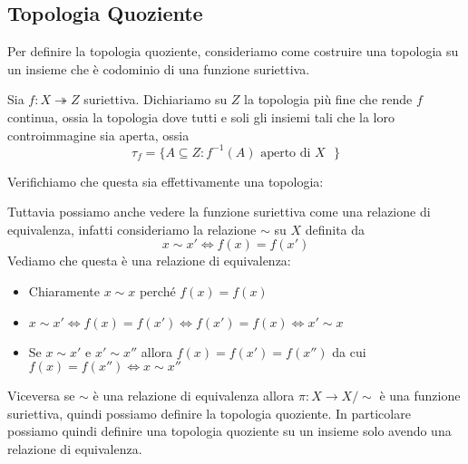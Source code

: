 \subsection{Topologia Quoziente}
Per definire la topologia quoziente, consideriamo come costruire una
topologia su un insieme che è codominio di una funzione suriettiva.
\begin{definition}

Sia
\(f: X \twoheadrightarrow Z\) suriettiva. Dichiariamo su \(Z\) la topologia più
fine che rende \(f\) continua, ossia la topologia dove tutti e soli gli insiemi
tali che la loro controimmagine sia aperta, ossia
\[
    \tau_f = \{A \subseteq Z : f^{-1}(A) \text{ aperto di \(X\)  }\}
\]
\end{definition}
Verifichiamo che questa sia effettivamente una topologia:
Tuttavia possiamo anche vedere la funzione suriettiva come una relazione di
equivalenza, infatti consideriamo la relazione \(\sim\) su \(X\) definita da
\[
    x \sim x' \iff f(x) = f(x')
\]
Vediamo che questa è una relazione di equivalenza:
\begin{itemize}[label = --]
    \item Chiaramente \(x \sim x\) perché \(f(x) = f(x)\) 
    \item \(x \sim x' \iff f(x) = f(x') \iff f(x') = f(x) \iff x' \sim x\) 
    \item Se \(x \sim x'\) e \(x' \sim x''\) allora \(f(x) = f(x') = f(x'')\) da
        cui \(f(x) = f(x'') \iff x \sim x''\) 
\end{itemize}
Viceversa se \(\sim\) è una relazione di equivalenza allora \(\pi : X \to
X/\sim\) è una funzione suriettiva, quindi possiamo definire la topologia
quoziente. In particolare possiamo quindi definire una topologia quoziente su un
insieme solo avendo una relazione di equivalenza.


